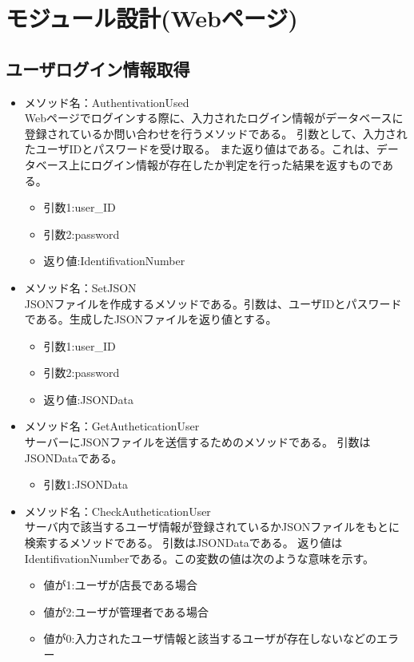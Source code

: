 \documentclass[a4j]{jarticle}
\begin{document}
\section{モジュール設計(Webページ)}
\subsection{ユーザログイン情報取得}
\begin{itemize}
\item メソッド名：AuthentivationUsed\\
Webページでログインする際に、入力されたログイン情報がデータベースに登録されているか問い合わせを行うメソッドである。
引数として、入力されたユーザIDとパスワードを受け取る。
また返り値はである。これは、データベース上にログイン情報が存在したか判定を行った結果を返すものである。

	\begin{itemize}
		\item 引数1:user\_ID
		\item 引数2:password
		\item 返り値:IdentifivationNumber
	\end{itemize}
\item メソッド名：SetJSON\\

JSONファイルを作成するメソッドである。引数は、ユーザIDとパスワードである。生成したJSONファイルを返り値とする。
	\begin{itemize}
		\item 引数1:user\_ID
		\item 引数2:password
		\item 返り値:JSONData
	\end{itemize}
\item メソッド名：GetAutheticationUser\\

サーバーにJSONファイルを送信するためのメソッドである。
引数はJSONDataである。
	\begin{itemize}
		\item 引数1:JSONData
	\end{itemize}
	
\item メソッド名：CheckAutheticationUser\\

サーバ内で該当するユーザ情報が登録されているかJSONファイルをもとに検索するメソッドである。
引数はJSONDataである。
返り値はIdentifivationNumberである。この変数の値は次のような意味を示す。
	\begin{itemize}
		\item 値が1:ユーザが店長である場合
		\item 値が2:ユーザが管理者である場合
		\item 値が0:入力されたユーザ情報と該当するユーザが存在しないなどのエラー
	\end{itemize}



\end{itemize}
\end{document}
